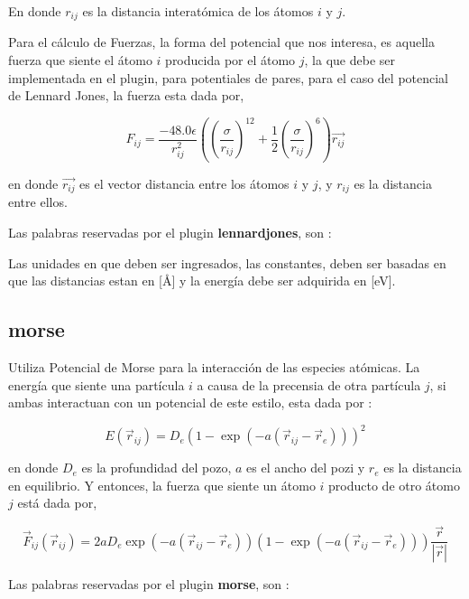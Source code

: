 En donde $r_{ij}$ es la distancia interat\'omica de los \'atomos $i$ y $j$. 

Para el c\'alculo de Fuerzas, la forma del potencial que nos interesa, es
aquella fuerza que siente el \'atomo $i$ producida por el \'atomo $j$, la que
debe ser implementada en el plugin, para potentiales de pares, para el caso del
potencial de Lennard Jones, la fuerza esta dada por,

$$F_{ij} = \frac{-48.0\epsilon}{r_{ij}^2}\left(
\left(\frac{\sigma}{r_{ij}}\right)^{12} +
\frac{1}{2}\left(\frac{\sigma}{r_{ij}}\right)^6 \right) \vec{r_{ij}}$$

en donde $\vec{r_{ij}}$ es el vector distancia entre los \'atomos $i$ y $j$, y
$r_{ij}$ es la distancia entre ellos. 

Las palabras reservadas por el plugin \textbf{lennardjones}, son :


Las unidades en que deben ser ingresados, las constantes, deben ser basadas en
que las distancias estan en [\AA] y la energ\'ia debe ser adquirida en [eV].

\subsection{morse}
Utiliza Potencial de Morse para la interacci\'on de las especies at\'omicas. La
energ\'ia que siente una part\'icula $i$ a causa de la precensia de otra
part\'icula $j$, si ambas interactuan con un potencial de este estilo, esta dada
por :

$$E(\vec{r}_{ij}) = D_e\left(1-\exp(-a(\vec{r}_{ij}-\vec{r}_e))\right)^2$$

en donde $D_e$ es la profundidad del pozo, $a$ es el ancho del pozi y $r_e$ es
la distancia en equilibrio. Y entonces, la fuerza que siente un \'atomo $i$
producto de otro \'atomo $j$ est\'a dada por,

$$\vec{F}_{ij} ( \vec{r}_{ij}) =
2aD_e\exp(-a(\vec{r}_{ij}-\vec{r}_e))\left(1-\exp(-a(\vec{r}_{ij}-\vec{r}
_e))\right)\frac{\vec{r}}{|\vec{r}|}$$

Las palabras reservadas por el plugin \textbf{morse}, son :

